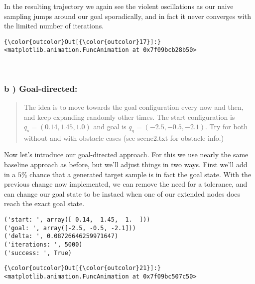 \documentclass{article}
\begin{document}
    In the resulting trajectory we again see the violent oscillations as our
naive sampling jumps around our goal sporadically, and in fact it never
converges with the limited number of iterations.


            \begin{Verbatim}[commandchars=\\\{\}]
{\color{outcolor}Out[{\color{outcolor}17}]:} <matplotlib.animation.FuncAnimation at 0x7f09bcb28b50>
\end{Verbatim}
        
    \begin{center}
    \end{center}
    { \hspace*{\fill} \\}
    

    \subsubsection{b ) Goal-directed:}


    \begin{quote}
The idea is to move towards the goal configuration every now and then,
and keep expanding randomly other times. The start configuration is
$q_s = (0.14, 1.45, 1.0)$ and goal is $q_g = (− 2.5, − 0.5, − 2.1 )$.
Try for both without and with obstacle cases (see scene2.txt for
obstacle info.)
\end{quote}

    Now let's introduce our goal-directed approach. For this we use nearly
the same baseline approach as before, but we'll adjust things in two
ways. First we'll add in a $5\%$ chance that a generated target sample
is in fact the goal state. With the previous change now implemented, we
can remove the need for a tolerance, and can change our goal state to be
instaed when one of our extended nodes does reach the exact goal state.



    \begin{Verbatim}[commandchars=\\\{\}]
('start: ', array([ 0.14,  1.45,  1.  ]))
('goal: ', array([-2.5, -0.5, -2.1]))
('delta: ', 0.08726646259971647)
('iterations: ', 5000)
('success: ', True)
    \end{Verbatim}



            \begin{Verbatim}[commandchars=\\\{\}]
{\color{outcolor}Out[{\color{outcolor}21}]:} <matplotlib.animation.FuncAnimation at 0x7f09bc507c50>
\end{Verbatim}
        
\end{document}
